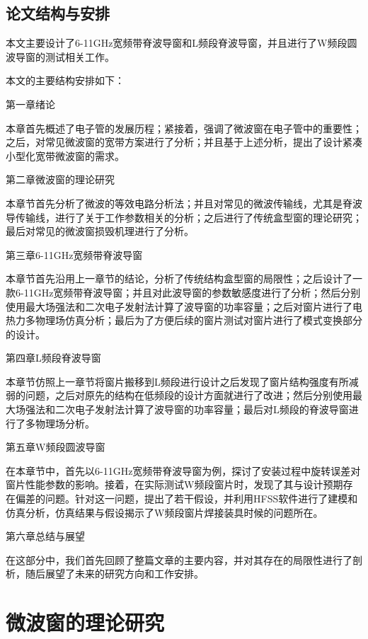 \documentclass[master]{thesis-uestc}
\begin{document}
\section{论文结构与安排}
本文主要设计了6-11GHz宽频带脊波导窗和L频段脊波导窗，并且进行了W频段圆波导窗的测试相关工作。

本文的主要结构安排如下：

第一章\hspace{6pt}绪论

本章首先概述了电子管的发展历程；紧接着，强调了微波窗在电子管中的重要性；之后，对常见微波窗的宽带方案进行了分析；并且基于上述分析，提出了设计紧凑小型化宽带微波窗的需求。

第二章\hspace{6pt}微波窗的理论研究

本章节首先分析了微波的等效电路分析法；并且对常见的微波传输线，尤其是脊波导传输线，进行了关于工作参数相关的分析；之后进行了传统盒型窗的理论研究；最后对常见的微波窗损毁机理进行了分析。

第三章\hspace{6pt}6-11GHz宽频带脊波导窗

本章节首先沿用上一章节的结论，分析了传统结构盒型窗的局限性；之后设计了一款6-11GHz宽频带脊波导窗；并且对此波导窗的参数敏感度进行了分析；然后分别使用最大场强法和二次电子发射法计算了波导窗的功率容量；之后对窗片进行了电热力多物理场仿真分析；最后为了方便后续的窗片测试对窗片进行了模式变换部分的设计。

第四章\hspace{6pt}L频段脊波导窗

本章节仿照上一章节将窗片搬移到L频段进行设计之后发现了窗片结构强度有所减弱的问题，之后对原先的结构在低频段的设计方面就进行了改进；然后分别使用最大场强法和二次电子发射法计算了波导窗的功率容量；最后对L频段的脊波导窗进行了多物理场分析。

第五章\hspace{6pt}W频段圆波导窗

在本章节中，首先以6-11GHz宽频带脊波导窗为例，探讨了安装过程中旋转误差对窗片性能参数的影响。接着，在实际测试W频段窗片时，发现了其与设计预期存在偏差的问题。针对这一问题，提出了若干假设，并利用HFSS软件进行了建模和仿真分析，仿真结果与假设揭示了W频段窗片焊接装具时候的问题所在。

第六章\hspace{6pt}总结与展望

在这部分中，我们首先回顾了整篇文章的主要内容，并对其存在的局限性进行了剖析，随后展望了未来的研究方向和工作安排。


\chapter{微波窗的理论研究}
\end{document}
